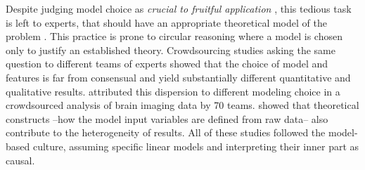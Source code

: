 \documentclass[french,12pt,twoside,a4paper]{book}
\def\sbc{\sffamily\fontseries{sbc}\selectfont}
\def\sbc{\fontseries{sbc}\selectfont}
\def\bsf#1{{\sffamily\sbc\fontsize{14}{11}\selectfont #1}}
\newcommand{\important}[1]{\textcolor{h_color}{\bsf{#1}}}
\begin{document}
Despite judging model choice as \textit{crucial to fruitful application}
\citep{cox2006principles}, this tedious task is left to experts, that should have an
appropriate theoretical model of the problem \citep{cox2001statistical}. This
practice is prone to circular reasoning where a model is chosen only to justify an
established theory. \important{Crowdsourcing studies asking the same question to
  different teams of experts showed that the choice of model and features is far
  from consensual and yield substantially different quantitative and qualitative
  results.} \cite{botvinik2020variability} attributed this dispersion to different
modeling choice in a crowdsourced analysis of brain imaging data by 70 teams.
\cite{schweinsberg2021same} showed that theoretical constructs --how the
model input variables are defined from raw data-- also contribute to the heterogeneity of results.
All of these studies followed the model-based culture, assuming specific linear
models and interpreting their inner part as causal.

\end{document}
